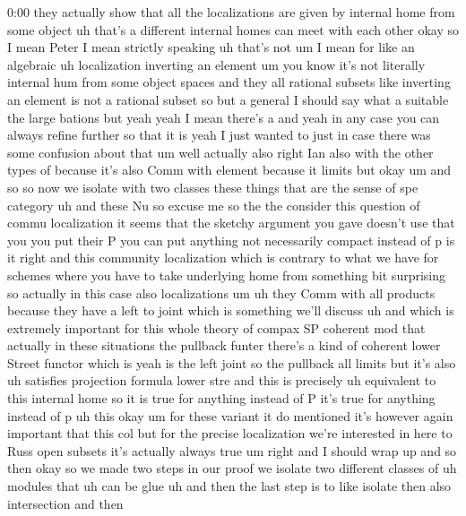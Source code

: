 \begin{unfinished}{0:00}
they  actually  show  that  all  the
localizations  are  given  by  internal  home
from  some  object
uh
that's  a  different  internal  homes  can
meet  with  each
other  okay
so  I  mean  Peter  I  mean  strictly  speaking
uh  that's  not  um  I  mean  for  like  an
algebraic  uh  localization  inverting  an
element
um  you  know  it's  not  literally  internal
hum  from  some  object  spaces  and  they  all
rational  subsets  like  inverting  an
element  is  not  a  rational
subset  so  but  a  general  I  should  say
what  a  suitable  the  large  bations  but
yeah  yeah  I  mean  there's  a  and  yeah  in
any  case  you  can  always  refine  further
so  that  it  is  yeah  I  just  wanted  to  just
in  case  there  was  some  confusion  about
that
um  well  actually  also
right  Ian  also  with  the  other  types  of
because  it's  also  Comm  with  element
because
it  limits
but  okay
um  and
so  so  now  we  isolate  with  two  classes
these  things  that
are  the  sense  of  spe  category  uh  and
these
Nu  so  excuse  me  so  the  the  consider  this
question  of  commu  localization  it  seems
that  the  sketchy  argument  you  gave
doesn't  use  that  you  you  put  their  P  you
can  put  anything  not  necessarily  compact
instead  of  p  is  it  right  and  this
community  localization  which  is  contrary
to  what  we  have  for  schemes  where  you
have  to  take  underlying  home  from
something  bit  surprising  so  actually  in
this  case  also
localizations
um  uh  they  Comm  with  all  products
because  they  have  a  left  to  joint  which
is  something  we'll  discuss  uh  and  which
is  extremely  important  for  this  whole
theory  of  compax  SP  coherent  mod  that
actually  in  these  situations  the
pullback  funter  there's  a  kind  of
coherent  lower  Street  functor  which
is  yeah  is  the  left  joint  so  the
pullback  all  limits  but  it's  also  uh
satisfies  projection  formula  lower  stre
and  this  is  precisely  uh  equivalent  to
this  internal  home  so  it  is  true  for
anything  instead  of  P  it's  true  for
anything  instead  of  p  uh  this  okay
um  for  these  variant  it  do  mentioned
it's  however  again  important  that  this
col  but  for  the  precise  localization
we're  interested  in  here  to  Russ  open
subsets  it's  actually  always
true  um  right  and  I  should  wrap  up  and
so  then  okay  so  we  made  two  steps  in  our
proof  we  isolate  two  different  classes
of  uh  modules  that  uh  can  be  glue
uh  and  then  the  last  step  is  to  like
isolate  then  also  intersection  and  then

\end{unfinished}
